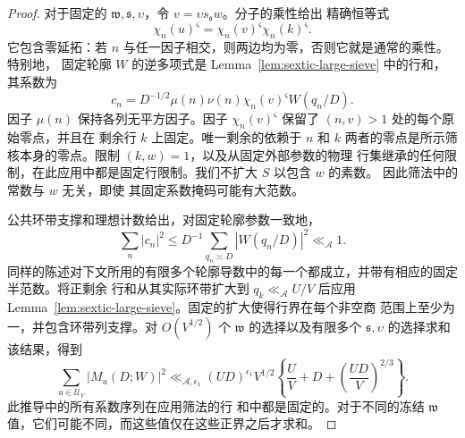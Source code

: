 \documentclass[11pt,a4paper]{article}
\numberwithin{equation}{section}
\numberwithin{figure}{section}
\theoremstyle{definition}
\theoremstyle{remark}
\begin{document}
\begin{proof}
对于固定的 $\mathfrak w,\mathfrak s,\upsilon$，令
$v=\upsilon s_{\mathfrak s}w$。分子的乘性给出
精确恒等式
\begin{equation}\label{eq:sextic-frozen-mask}
 \chi_n(u)^{\varsigma}
   =\chi_n(v)^{\varsigma}\chi_n(k)^{\varsigma}.
\end{equation}
它包含零延拓：若 $n$ 与任一因子相交，则两边均为零，否则它就是通常的乘性。特别地，
固定轮廓 $W$ 的逆多项式是
Lemma~\ref{lem:sextic-large-sieve} 中的行和，其系数为
\[
 c_n=D^{-1/2}\mu(n)\nu(n)\chi_n(v)^{\varsigma}W(q_n/D).
\]
因子 $\mu(n)$ 保持各列无平方因子。因子
$\chi_n(v)^{\varsigma}$ 保留了 $(n,v)>1$ 处的每个原始零点，并且在
剩余行 $k$ 上固定。唯一剩余的依赖于
$n$ 和 $k$ 两者的零点是所示筛核本身的零点。限制 $(k,w)=1$，以及从固定外部参数的物理
行集继承的任何限制，在此应用中都是固定行限制。我们不扩大 $S$ 以包含 $w$ 的素数。
因此筛法中的常数与 $w$ 无关，即使
其固定系数掩码可能有大范数。

公共环带支撑和理想计数给出，对固定轮廓参数一致地，
\[
 \sum_n|c_n|^2
 \le D^{-1}\sum_{q_n\asymp D}|W(q_n/D)|^2\ll_{\mathcal A}1.
\]
同样的陈述对下文所用的有限多个轮廓导数中的每一个都成立，并带有相应的固定半范数。将正剩余
行和从其实际环带扩大到 $q_k\ll_{\mathcal A}U/V$ 后应用
Lemma~\ref{lem:sextic-large-sieve}。固定的扩大使得行界在每个非空商
范围上至少为一，并包含环带列支撑。对
$O(V^{1/2})$ 个 $\mathfrak w$ 的选择以及有限多个
$\mathfrak s,\upsilon$ 的选择求和该结果，得到
\begin{equation}\label{eq:sextic-stratum-fixed-moment}
 \sum_{u\in\mathcal U_V}|M_u(D;W)|^2
 \ll_{\mathcal A,\epsilon_1}(UD)^{\epsilon_1}V^{1/2}
 \left\{\frac UV+D+\left(\frac{UD}{V}\right)^{2/3}\right\}.
\end{equation}
此推导中的所有系数序列在应用筛法的行
和中都是固定的。对于不同的冻结
$\mathfrak w$ 值，它们可能不同，而这些值仅在这些正界之后才求和。


\end{proof}
\end{document}
